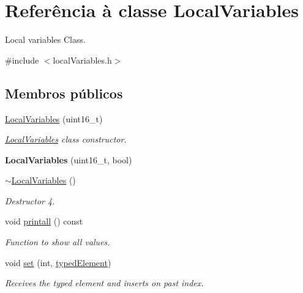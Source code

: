 \hypertarget{classLocalVariables}{}\section{Referência à classe Local\+Variables}
\label{classLocalVariables}


Local variables Class.  




{\ttfamily \#include $<$local\+Variables.\+h$>$}

\subsection*{Membros públicos}
\begin{DoxyCompactItemize}
\item 
\hyperlink{classLocalVariables_ae354d02f996f4f584fe857d9304161c1}{Local\+Variables} (uint16\+\_\+t)
\begin{DoxyCompactList}\small\item\em \hyperlink{classLocalVariables}{Local\+Variables} class constructor. \end{DoxyCompactList}\item 
\mbox{\label{classLocalVariables_aade71d244aca34815b7cab3b0fc57f27}} 
{\bfseries Local\+Variables} (uint16\+\_\+t, bool)
\item 
\mbox{\label{classLocalVariables_aaf00f6cc3391fdd2cc0ecd2b1d31c887}} 
\hyperlink{classLocalVariables_aaf00f6cc3391fdd2cc0ecd2b1d31c887}{$\sim$\+Local\+Variables} ()
\begin{DoxyCompactList}\small\item\em Destructor 4. \end{DoxyCompactList}\item 
\mbox{\label{classLocalVariables_a276a90a0e812a4d54601c7464dc9ee6a}} 
void \hyperlink{classLocalVariables_a276a90a0e812a4d54601c7464dc9ee6a}{printall} () const
\begin{DoxyCompactList}\small\item\em Function to show all values. \end{DoxyCompactList}\item 
void \hyperlink{classLocalVariables_ac48ae40b67afb74083ebb1163477a1a6}{set} (int, \hyperlink{structtypedElement__s}{typed\+Element})
\begin{DoxyCompactList}\small\item\em Receives the typed element and inserts on past index. \end{DoxyCompactList}\item 

\end{DoxyCompactItemize}

